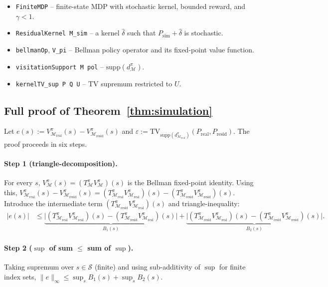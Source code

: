 \documentclass{article}
\theoremstyle{definition}
\newcommand{\Mreal}{\mathcal{M}_{\mathrm{real}}}
\newcommand{\Mresid}{\mathcal{M}_{\mathrm{resid}}}
\newcommand{\Psim}{P_{\mathrm{sim}}}
\newcommand{\Preal}{P_{\mathrm{real}}}
\newcommand{\Presid}{P_{\mathrm{resid}}}
\newcommand{\eps}{\varepsilon}
\newcommand{\supp}{\mathrm{supp}}
\newcommand{\Vpi}{V^{\pi}}
\newcommand{\dpi}{d^{\pi}}
\begin{document}
\begin{itemize}
\item \texttt{FiniteMDP} -- finite-state MDP with stochastic kernel,
bounded reward, and $\gamma<1$.
\item \texttt{ResidualKernel M\_sim} -- a kernel $\hat\delta$ such that
$\Psim+\hat\delta$ is stochastic.
\item \texttt{bellmanOp}, \texttt{V\_pi} -- Bellman policy operator and
its fixed-point value function.
\item \texttt{visitationSupport M pol} -- $\supp(\dpi_{\mathcal M})$.
\item \texttt{kernelTV\_sup P Q U} -- TV supremum restricted to $U$.
\end{itemize}

\subsection{Full proof of Theorem~\ref{thm:simulation}}

Let $e(s):=\Vpi_{\Mreal}(s)-\Vpi_{\Mresid}(s)$ and
$\eps:=\mathrm{TV}_{\supp(\dpi_{\Mreal})}(\Preal,\Presid)$.
The proof proceeds in six steps.

\paragraph{Step 1 (triangle-decomposition).}
For every $s$, $\Vpi_{\mathcal M}(s) = (T^\pi_{\mathcal M}\Vpi_{\mathcal M})(s)$
is the Bellman fixed-point identity.  Using this,
$\Vpi_{\Mreal}(s) - \Vpi_{\Mresid}(s)
= (T^\pi_{\Mreal}\Vpi_{\Mreal})(s) - (T^\pi_{\Mresid}\Vpi_{\Mresid})(s)$.
Introduce the intermediate term $(T^\pi_{\Mresid}\Vpi_{\Mreal})(s)$ and
triangle-inequality:
\begin{align*}
|e(s)| &\le
\underbrace{\bigl|(T^\pi_{\Mreal}\Vpi_{\Mreal})(s) - (T^\pi_{\Mresid}\Vpi_{\Mreal})(s)\bigr|}_{B_1(s)}
+ \underbrace{\bigl|(T^\pi_{\Mresid}\Vpi_{\Mreal})(s) - (T^\pi_{\Mresid}\Vpi_{\Mresid})(s)\bigr|}_{B_2(s)}.
\end{align*}

\paragraph{Step 2 ($\sup$ of sum $\le$ sum of $\sup$).}
Taking supremum over $s\in\mathcal S$ (finite) and using sub-additivity
of $\sup$ for finite index sets,
$\|e\|_\infty \le \sup_s B_1(s) + \sup_s B_2(s)$.
\end{document}

